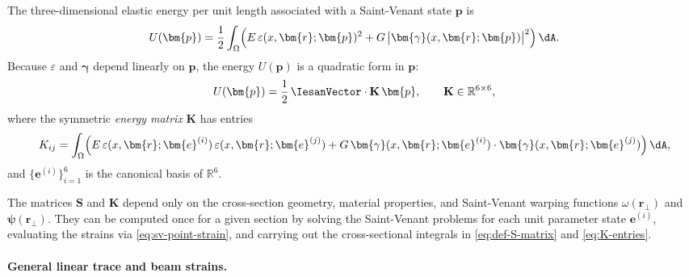 The three-dimensional elastic energy per unit length associated with a
Saint-Venant state $\bm{p}$ is
\begin{equation}
U(\bm{p})
=
\frac{1}{2}
\int_\Omega \Bigl(
E\,\varepsilon(x,\bm{r};\bm{p})^2
+
G\,\bigl|\bm{\gamma}(x,\bm{r};\bm{p})\bigr|^2
\Bigr)\,\dA.
\label{eq:sv-energy}
\end{equation}
Because $\varepsilon$ and $\bm{\gamma}$ depend linearly on $\bm{p}$, the
energy $U(\bm{p})$ is a quadratic form in $\bm{p}$:
\begin{equation}
U(\bm{p})
=
\frac{1}{2}\,\IesanVector\cdot \mathbf{K}\,\bm{p},
\qquad
\mathbf{K} \in \mathbb{R}^{6\times 6},
\label{eq:def-K-matrix}
\end{equation}
where the symmetric \emph{energy matrix} $\mathbf{K}$ has entries
\begin{equation}
K_{ij}
=
\int_\Omega \Bigl(
E\,\varepsilon(x,\bm{r};\bm{e}^{(i)})\,\varepsilon(x,\bm{r};\bm{e}^{(j)})
+
G\,\bm{\gamma}(x,\bm{r};\bm{e}^{(i)})\cdot
\bm{\gamma}(x,\bm{r};\bm{e}^{(j)})
\Bigr)\,\dA,
\label{eq:K-entries}
\end{equation}
and $\{\bm{e}^{(i)}\}_{i=1}^6$ is the canonical basis of $\mathbb{R}^6$.

\begin{remark}
The matrices $\mathbf{S}$ and $\mathbf{K}$ depend only on the cross-section
geometry, material properties, and Saint-Venant warping functions
$\omega(\bm{r}_\perp)$ and $\bm{\psi}(\bm{r}_\perp)$. They can be computed
once for a given section by solving the Saint-Venant problems for each unit
parameter state $\bm{e}^{(i)}$, evaluating the strains via
\eqref{eq:sv-point-strain}, and carrying out the cross-sectional integrals in
\eqref{eq:def-S-matrix} and \eqref{eq:K-entries}.
\end{remark}

\paragraph{General linear trace and beam strains.}

